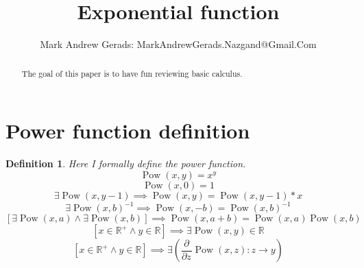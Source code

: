 \documentclass[]{article}
\author{Mark Andrew Gerads: MarkAndrewGerads.Nazgand@Gmail.Com}
\title{Exponential function}
\DeclareMathOperator{\pow}{Pow}
\newcommand{\pqty}[1]{{\left(#1\right)}}
\newcommand{\bqty}[1]{{\left[#1\right]}}
\newcommand{\pdiff}[2]{\frac{\partial^{#2}}{\partial #1^{#2}}}
\newtheorem{definition}[theorem]{Definition}
\numberwithin{equation}{section}
\begin{document}
	
	\maketitle
	
	\begin{abstract}
		The goal of this paper is to have fun reviewing basic calculus.
	\end{abstract}
	
	\section{Power function definition}
	\begin{definition}
			Here I formally define the power function.
		\begin{equation}
			\pow\pqty{x,y}=x^y
		\end{equation}
		\begin{equation}
			\pow\pqty{x,0}=1
		\end{equation}
		\begin{equation}
			\exists\pow\pqty{x,y-1}\implies\pow\pqty{x,y}=\pow\pqty{x,y-1}*x
		\end{equation}
		\begin{equation}
			{\exists\pow\pqty{x,b}^{-1}}\implies\pow\pqty{x,-b}=\pow\pqty{x,b}^{-1}
		\end{equation}
		\begin{equation}
			\bqty{\exists\pow\pqty{x,a}\land\exists\pow\pqty{x,b}}\implies\pow\pqty{x,a+b}=\pow\pqty{x,a}\pow\pqty{x,b}
		\end{equation}
		\begin{equation}
			\bqty{x\in\mathbb{R}^+ \land y\in\mathbb{R}}\implies\exists\pow\pqty{x,y}\in\mathbb{R}
		\end{equation}
		\begin{equation}
			\bqty{x\in\mathbb{R}^+\land y\in\mathbb{R}}
			\implies\exists\pqty{\pdiff{z}{}\pow\pqty{x,z}:z\to y}
		\end{equation}
	\end{definition}
	
\end{document}
